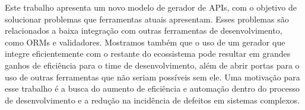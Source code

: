 Este trabalho apresenta um novo modelo de gerador de APIs, com o objetivo de solucionar
problemas que ferramentas atuais apresentam. Esses problemas são relacionados a baixa
integração com outras ferramentas de desenvolvimento, como ORMs e validadores. Mostramos
também que o uso de um gerador que integre eficientemente com o restante do ecossistema
pode resultar em grandes ganhos de eficiência para o time de desenvolvimento, além de
abrir portas para o uso de outras ferramentas que não seriam possíveis sem ele. Uma
motivação para esse trabalho é a busca do aumento de eficiência e automação dentro do
processo de desenvolvimento e a redução na incidência de defeitos em sistemas complexos.
